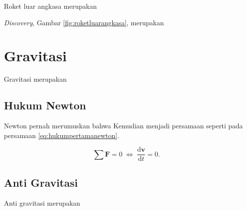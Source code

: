 Roket luar angkasa merupakan \lipsum[1]

\emph{Discovery}, Gambar \ref{fig:roketluarangkasa}, merupakan \lipsum[2]

\section{Gravitasi}
\label{sec:gravitasi}

Gravitasi merupakan \lipsum[1]

\subsection{Hukum Newton}
\label{subsec:hukumnewton2}

Newton \citep{newton1687} pernah merumuskan bahwa \lipsum[1]
Kemudian menjadi persamaan seperti pada persamaan \ref{eq:hukumpertamanewton}.

\begin{equation}
  \label{eq:hukumpertamanewton}
  \sum \mathbf{F} = 0\; \Leftrightarrow\; \frac{\mathrm{d} \mathbf{v} }{\mathrm{d}t} = 0.
\end{equation}

\subsection{Anti Gravitasi}
\label{subsec:antigravitasi}

Anti gravitasi merupakan \lipsum[1]
